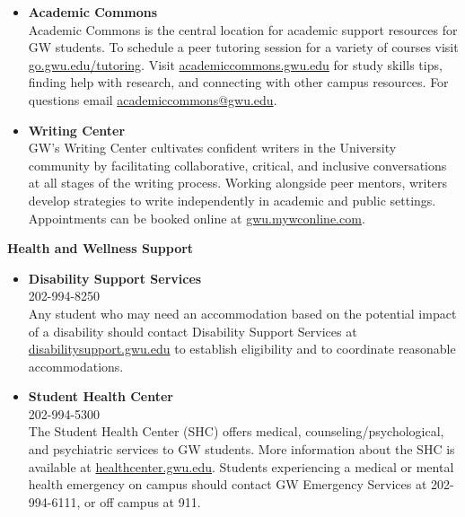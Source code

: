\documentclass[12pt,letterpaper]{article}
\begin{document}
\begin{itemize}
  \item \textbf{Academic Commons} \\
    Academic Commons is the central location for academic support
    resources for GW students. To schedule a peer tutoring session
    for a variety of courses visit
    \href{https://go.gwu.edu/tutoring}{go.gwu.edu/tutoring}. Visit
    \href{https://academiccommons.gwu.edu}{academiccommons.gwu.edu}
    for study skills tips, finding help with research, and connecting
    with other campus resources. For questions email
    \href{mailto:academiccommons@gwu.edu}{academiccommons@gwu.edu}.
  \item \textbf{Writing Center} \\
    GW’s Writing Center cultivates confident writers in the
    University community by facilitating collaborative, critical, and
    inclusive conversations at all stages of the writing process.
    Working alongside peer mentors, writers develop strategies to
    write independently in academic and public settings. Appointments
    can be booked online at
    \href{https://gwu.mywconline.com}{gwu.mywconline.com}.
\end{itemize}

\textbf{Health and Wellness Support}

\begin{itemize}
  \item \textbf{Disability Support Services} \\
    202-994-8250 \\
    Any student who may need an accommodation based on the potential
    impact of a disability should contact Disability Support Services
    at
    \href{https://disabilitysupport.gwu.edu}{disabilitysupport.gwu.edu}
    to establish eligibility and to coordinate reasonable accommodations.
  \item \textbf{Student Health Center} \\
    202-994-5300\\
    The Student Health Center (SHC) offers medical,
    counseling/psychological, and psychiatric services to GW
    students. More information about the SHC is available at
    \href{https://healthcenter.gwu.edu}{healthcenter.gwu.edu}.
    Students experiencing a medical or mental health emergency on
    campus should contact GW Emergency Services at 202-994-6111, or
    off campus at 911.
\end{itemize}
\vspace{-.5em}
\end{document}
